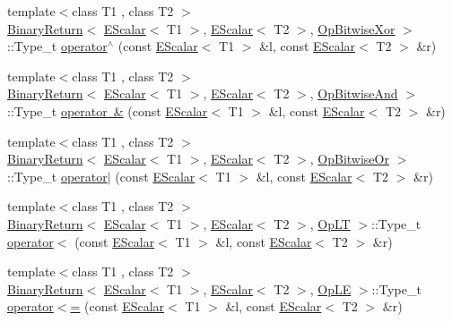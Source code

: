 \begin{DoxyCompactItemize}
{\footnotesize template$<$class T1 , class T2 $>$ }\\\mbox{\hyperlink{structENSEM_1_1BinaryReturn}{Binary\+Return}}$<$ \mbox{\hyperlink{classENSEM_1_1EScalar}{E\+Scalar}}$<$ T1 $>$, \mbox{\hyperlink{classENSEM_1_1EScalar}{E\+Scalar}}$<$ T2 $>$, \mbox{\hyperlink{structENSEM_1_1OpBitwiseXor}{Op\+Bitwise\+Xor}} $>$\+::Type\+\_\+t \mbox{\hyperlink{group__escalar_ga61ae38c220aff90c4be30fbab0974540}{operator$^\wedge$}} (const \mbox{\hyperlink{classENSEM_1_1EScalar}{E\+Scalar}}$<$ T1 $>$ \&l, const \mbox{\hyperlink{classENSEM_1_1EScalar}{E\+Scalar}}$<$ T2 $>$ \&r)
\item 
{\footnotesize template$<$class T1 , class T2 $>$ }\\\mbox{\hyperlink{structENSEM_1_1BinaryReturn}{Binary\+Return}}$<$ \mbox{\hyperlink{classENSEM_1_1EScalar}{E\+Scalar}}$<$ T1 $>$, \mbox{\hyperlink{classENSEM_1_1EScalar}{E\+Scalar}}$<$ T2 $>$, \mbox{\hyperlink{structENSEM_1_1OpBitwiseAnd}{Op\+Bitwise\+And}} $>$\+::Type\+\_\+t \mbox{\hyperlink{group__escalar_ga445352dd6ecea4dcb57bfd1abcda2a0b}{operator \&}} (const \mbox{\hyperlink{classENSEM_1_1EScalar}{E\+Scalar}}$<$ T1 $>$ \&l, const \mbox{\hyperlink{classENSEM_1_1EScalar}{E\+Scalar}}$<$ T2 $>$ \&r)
\item 
{\footnotesize template$<$class T1 , class T2 $>$ }\\\mbox{\hyperlink{structENSEM_1_1BinaryReturn}{Binary\+Return}}$<$ \mbox{\hyperlink{classENSEM_1_1EScalar}{E\+Scalar}}$<$ T1 $>$, \mbox{\hyperlink{classENSEM_1_1EScalar}{E\+Scalar}}$<$ T2 $>$, \mbox{\hyperlink{structENSEM_1_1OpBitwiseOr}{Op\+Bitwise\+Or}} $>$\+::Type\+\_\+t \mbox{\hyperlink{group__escalar_gadc4bc2eaed30b8d8661741f6ece0de03}{operator$\vert$}} (const \mbox{\hyperlink{classENSEM_1_1EScalar}{E\+Scalar}}$<$ T1 $>$ \&l, const \mbox{\hyperlink{classENSEM_1_1EScalar}{E\+Scalar}}$<$ T2 $>$ \&r)
\item 
{\footnotesize template$<$class T1 , class T2 $>$ }\\\mbox{\hyperlink{structENSEM_1_1BinaryReturn}{Binary\+Return}}$<$ \mbox{\hyperlink{classENSEM_1_1EScalar}{E\+Scalar}}$<$ T1 $>$, \mbox{\hyperlink{classENSEM_1_1EScalar}{E\+Scalar}}$<$ T2 $>$, \mbox{\hyperlink{structENSEM_1_1OpLT}{Op\+LT}} $>$\+::Type\+\_\+t \mbox{\hyperlink{group__escalar_gad3a307ef5e78a5c23670ded8c75cdde5}{operator$<$}} (const \mbox{\hyperlink{classENSEM_1_1EScalar}{E\+Scalar}}$<$ T1 $>$ \&l, const \mbox{\hyperlink{classENSEM_1_1EScalar}{E\+Scalar}}$<$ T2 $>$ \&r)
\item 
{\footnotesize template$<$class T1 , class T2 $>$ }\\\mbox{\hyperlink{structENSEM_1_1BinaryReturn}{Binary\+Return}}$<$ \mbox{\hyperlink{classENSEM_1_1EScalar}{E\+Scalar}}$<$ T1 $>$, \mbox{\hyperlink{classENSEM_1_1EScalar}{E\+Scalar}}$<$ T2 $>$, \mbox{\hyperlink{structENSEM_1_1OpLE}{Op\+LE}} $>$\+::Type\+\_\+t \mbox{\hyperlink{group__escalar_gaf6abf7f5f838e38b67549d4af6f8683a}{operator$<$=}} (const \mbox{\hyperlink{classENSEM_1_1EScalar}{E\+Scalar}}$<$ T1 $>$ \&l, const \mbox{\hyperlink{classENSEM_1_1EScalar}{E\+Scalar}}$<$ T2 $>$ \&r)

\end{DoxyCompactItemize}
